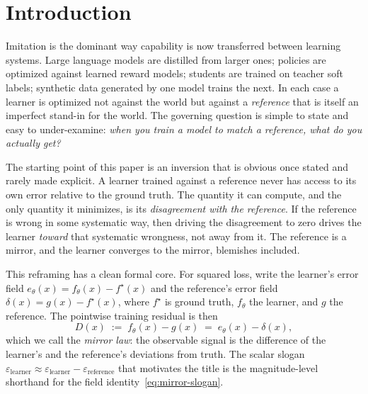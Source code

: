 \documentclass[10pt]{article} %
\theoremstyle{plain}
\theoremstyle{remark}
\newcommand{\fstar}{f^{\star}}
\newcommand{\eps}{\varepsilon}
\begin{document}
\begin{abstract}
descent and the matched-error Regime-B-vs-C separation in an autoregressive model, and exhibits a predicted capacity-dependent robustness in which the larger model's pretrained prior resists a verbosity-biased judge; an author-annotated human-feedback (RLHF) arm, in which an author supplies controlled-bias preference labels, reproduces the same pattern, with the smaller model collapsing under a human length bias while the larger partially resists. We are explicit throughout about what is classical and what is new: the estimator-level facts are known; the contributions are the unifying decomposition, the regime taxonomy, the trajectory-undetectability result, the calibration criterion, the non-realizable refinement, and the cross-domain mapping. We distill the results into a \emph{Mirror Audit Protocol} for grading references, detecting deceptive descent, and deciding when to stop, graduate, or decorrelate supervision.
\end{abstract}

\section{Introduction}

Imitation is the dominant way capability is now transferred between learning systems. Large language models are distilled from larger ones; policies are optimized against learned reward models; students are trained on teacher soft labels; synthetic data generated by one model trains the next. In each case a learner is optimized not against the world but against a \emph{reference} that is itself an imperfect stand-in for the world. The governing question is simple to state and easy to under-examine: \emph{when you train a model to match a reference, what do you actually get?}

The starting point of this paper is an inversion that is obvious once stated and rarely made explicit. A learner trained against a reference never has access to its own error relative to the ground truth. The quantity it can compute, and the only quantity it minimizes, is its \emph{disagreement with the reference}. If the reference is wrong in some systematic way, then driving the disagreement to zero drives the learner \emph{toward} that systematic wrongness, not away from it. The reference is a mirror, and the learner converges to the mirror, blemishes included.

This reframing has a clean formal core. For squared loss, write the learner's error field $e_\theta(x) = f_\theta(x) - \fstar(x)$ and the reference's error field $\delta(x) = g(x) - \fstar(x)$, where $\fstar$ is ground truth, $f_\theta$ the learner, and $g$ the reference. The pointwise training residual is then
\begin{equation}
D(x) \;:=\; f_\theta(x) - g(x) \;=\; e_\theta(x) - \delta(x),
\label{eq:mirror-slogan}
\end{equation}
which we call the \emph{mirror law}: the observable signal is the difference of the learner's and the reference's deviations from truth. The scalar slogan $\eps_{\text{learner}} \approx \eps_{\text{learner}} - \eps_{\text{reference}}$ that motivates the title is the magnitude-level shorthand for the field identity~\eqref{eq:mirror-slogan}.
\end{document}
